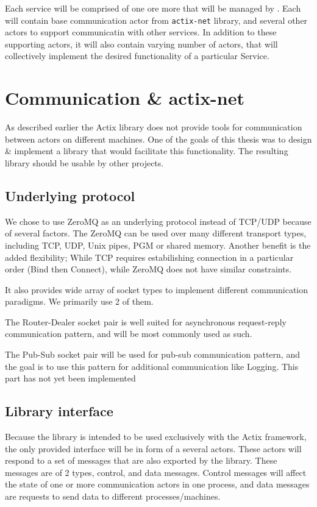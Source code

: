 Each service will be comprised of one ore more  that will be managed by . Each 
will contain base communication actor from \verb|actix-net| library, and several other actors to support communicatin with other services. In addition to
these supporting actors, it will also contain varying number of actors, that will collectively implement
the desired functionality of a particular Service.

\section{Communication \& actix-net}
\label{section:actix_net}
As described earlier the Actix library does not provide tools for communication between actors on different machines. One of the
goals of this thesis was to design \& implement a library that would facilitate this functionality. The resulting library
should be usable by other projects.

\subsection{Underlying protocol}
We chose to use ZeroMQ\cite{hintjens2011} as an underlying protocol instead of TCP/UDP because of several factors. The ZeroMQ can be used over
many different transport types, including TCP, UDP, Unix pipes, PGM or shared memory. Another benefit is the added flexibility; While
TCP requires estabilishing connection in a particular order (Bind then Connect), while ZeroMQ does not have similar constraints.

It also provides wide array of socket types to implement different communication paradigms. We primarily use 2 of them.

The Router-Dealer socket pair is well suited for asynchronous request-reply communication pattern, and will be most commonly used as
such.

The Pub-Sub socket pair will be used for pub-sub communication pattern, and the goal is to use this pattern for additional communication
like Logging. This part has not yet been implemented

\subsection{Library interface}
Because the library is intended to be used exclusively with the Actix framework, the only provided interface will be in form
of a several actors. These actors will respond to a set of messages that are also exported by the library. These messages
are of 2 types, control, and data messages. Control messages will affect the state of one or more communication actors
in one process, and data messages are requests to send data to different processes/machines.

